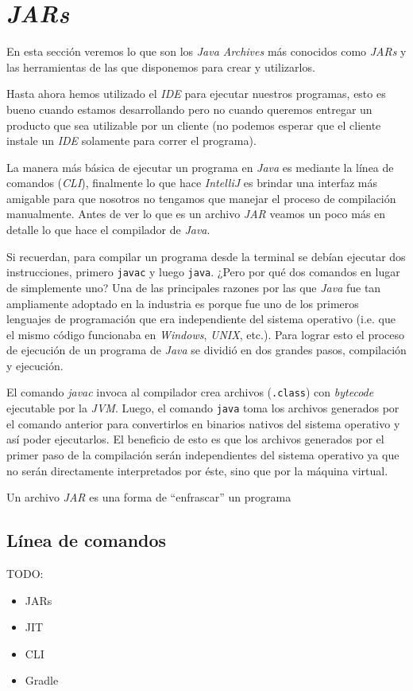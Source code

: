 \section{\textit{JARs}}
  En esta sección veremos lo que son los \textit{Java Archives} más conocidos como 
  \textit{JARs} y las herramientas de las que disponemos para crear y utilizarlos.

  Hasta ahora hemos utilizado el \textit{IDE} para ejecutar nuestros programas, esto es bueno cuando
  estamos desarrollando pero no cuando queremos entregar un producto que sea utilizable por un 
  cliente (no podemos esperar que el cliente instale un \textit{IDE} solamente para correr el 
  programa).

  La manera más básica de ejecutar un programa en \textit{Java} es mediante la línea de comandos 
  (\textit{CLI}), finalmente lo que hace \textit{IntelliJ} es brindar una interfaz más amigable para
  que nosotros no tengamos que manejar el proceso de compilación manualmente.
  Antes de ver lo que es un archivo \textit{JAR} veamos un poco más en detalle lo que hace el 
  compilador de \textit{Java}.

  Si recuerdan, para compilar un programa desde la terminal se debían ejecutar dos instrucciones,
  primero \texttt{javac} y luego \texttt{java}.
  ¿Pero por qué dos comandos en lugar de simplemente uno?
  Una de las principales razones por las que \textit{Java} fue tan ampliamente adoptado en la 
  industria es porque fue uno de los primeros lenguajes de programación que era independiente del
  sistema operativo (i.e. que el mismo código funcionaba en \textit{Windows}, \textit{UNIX}, etc.).
  Para lograr esto el proceso de ejecución de un programa de \textit{Java} se dividió en dos grandes
  pasos, compilación y ejecución.

  El comando \textit{javac} invoca al compilador crea archivos (\texttt{.class}) con 
  \textit{bytecode} ejecutable por la \textit{JVM}.
  Luego, el comando \texttt{java} toma los archivos generados por el comando anterior para 
  convertirlos en binarios nativos del sistema operativo y así poder ejecutarlos.
  El beneficio de esto es que los archivos generados por el primer paso de la compilación serán 
  independientes del sistema operativo ya que no serán directamente interpretados por éste, sino que
  por la máquina virtual.

  Un archivo \textit{JAR} es una forma de \enquote{enfrascar} un programa
  \subsection{Línea de comandos}

  TODO:
  \begin{itemize}
    \item JARs
    \item JIT
    \item CLI
    \item Gradle
  \end{itemize}